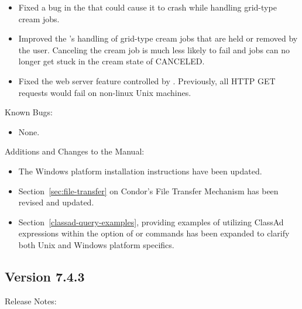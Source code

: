 \begin{itemize}
\item Fixed a bug in the  that could cause it to crash
while handling grid-type cream jobs.

\item Improved the 's handling of grid-type cream jobs
that are held or removed by the user. Canceling the cream job is much less
likely to fail and jobs can no longer get stuck in the cream state of
CANCELED.

\item Fixed the web server feature controlled by .
Previously, all HTTP GET requests would fail on non-linux Unix machines.

\end{itemize}

\noindent Known Bugs:

\begin{itemize}

\item None.

\end{itemize}

\noindent Additions and Changes to the Manual:

\begin{itemize}

\item The Windows platform installation instructions have been updated.

\item Section~\ref{sec:file-transfer} on Condor's File Transfer Mechanism
has been revised and updated.

\item Section~\ref{classad-query-examples}, providing examples of utilizing
ClassAd expressions within the  option of 
or  commands has been expanded to clarify both
Unix and Windows platform specifics.

\end{itemize}


\subsection*{\label{sec:New-7-4-3}Version 7.4.3}

\noindent Release Notes:

